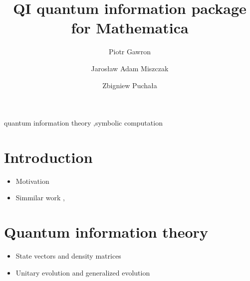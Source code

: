 \documentclass[preprint,12pt]{elsarticle}
\begin{document}
\begin{frontmatter}
\title{QI quantum information package for Mathematica}
%
\author[iitis]{Piotr Gawron}
%
\author[iitis]{Jaros{\l}aw Adam Miszczak}
%
\author[iitis]{Zbigniew Pucha{\l}a}
%
\address[iitis]{Institute of Theoretical and Applied Informatics, Polish Academy
of Sciences, Ba{\l}tycka 5, 44-100 Gliwice, Poland}

\begin{abstract}

\end{abstract}

\begin{keyword}
quantum information theory \sep symbolic computation


\end{keyword}

\end{frontmatter}


\section{Introduction}
\label{sec:introduction}
\begin{itemize}
\item Motivation
\item Simmilar work \cite{Tabakin_Julia-Diaz_2011}, \cite{Hudson_2008}
\end{itemize}

\section{Quantum information theory}
\label{sec:qitheory}
\begin{itemize}
\item State vectors and density matrices
\item Unitary evolution and generalized evolution
\end{itemize}




\end{document}
